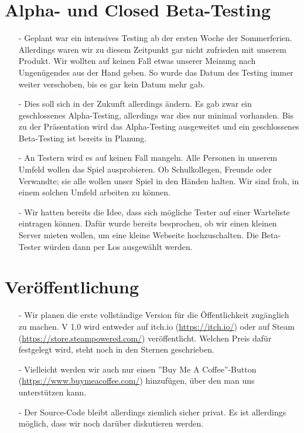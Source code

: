 \section{Alpha- und Closed Beta-Testing}
\begin{itemize}
    \item[-] Geplant war ein intensives Testing ab der ersten Woche der Sommerferien. Allerdings waren wir zu diesem Zeitpunkt gar nicht zufrieden mit unserem Produkt. Wir wollten
    auf keinen Fall etwas unserer Meinung nach Ungenügendes aus der Hand geben. So wurde das Datum des Testing immer weiter verschoben, bis es gar kein Datum mehr gab.
    \item[-] Dies soll sich in der Zukunft allerdings ändern. Es gab zwar ein geschlossenes Alpha-Testing, allerdings war dies nur minimal vorhanden. Bis zu der Präsentation wird
    das Alpha-Testing ausgeweitet und ein geschlossenes Beta-Testing ist bereits in Planung. 
    \item[-] An Testern wird es auf keinen Fall mangeln. Alle Personen in unserem Umfeld wollen
    das Spiel ausprobieren. Ob Schulkollegen, Freunde oder Verwandte; sie alle wollen unser Spiel in den Händen halten. Wir sind froh, in einem solchen Umfeld arbeiten zu können.
    \item[-] Wir hatten bereits die Idee, dass sich mögliche Tester auf einer Warteliste eintragen können. Dafür wurde bereits besprochen, ob wir einen kleinen Server mieten wollen,
    um eine kleine Webseite hochzuschalten. Die Beta-Tester würden dann per Los ausgewählt werden.
\end{itemize}


\section{Veröffentlichung}
\begin{itemize}
    \item[-] Wir planen die erste vollständige Version für die Öffentlichkeit zugänglich zu machen. V 1.0 wird entweder auf itch.io (\url{https://itch.io/}) oder auf Steam 
    (\url{https://store.steampowered.com/}) veröffentlicht. Welchen Preis dafür festgelegt wird, steht noch in den Sternen geschrieben.
    \item[-] Vielleicht werden wir auch nur einen ''Buy Me A Coffee''-Button (\url{https://www.buymeacoffee.com/}) hinzufügen, über den man uns unterstützen kann. 
    \item[-] Der Source-Code bleibt allerdings ziemlich sicher privat. Es ist allerdings möglich, dass wir noch darüber diskutieren werden. 
\end{itemize}



